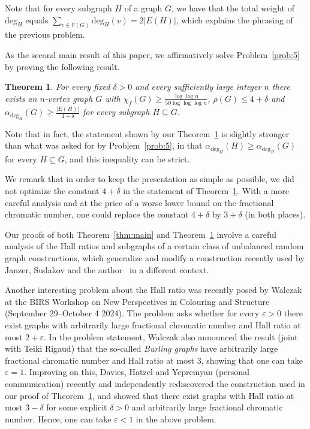 \documentclass[a4paper,10pt]{amsart}
\newtheorem{theorem}{Theorem}[section]
\begin{document}
Note that for every subgraph $H$ of a graph $G$, we have that the total weight of $\mathrm{deg}_H$ equals $\sum_{v\in V(G)}\mathrm{deg}_H(v)=2|E(H)|$, which explains the phrasing of the previous problem.

As the second main result of this paper, we affirmatively solve Problem~\ref{prob:5} by proving the following result. 

\begin{theorem}\label{thm:main2}
For every fixed $\delta >0$ and every sufficiently large integer $n$ there exists an $n$-vertex graph $G$ with $\chi_f(G)\ge \frac{\log \log n}{50 \log\log\log n}$, $\rho(G)\le 4+\delta$ and $\alpha_{\mathrm{deg}_H}(G)\ge \frac{|E(H)|}{4+\delta}$ for every subgraph $H\subseteq G$. 
\end{theorem}

Note that in fact, the statement shown by our Theorem~\ref{thm:main2} is slightly stronger than what was asked for by Problem~\ref{prob:5}, in that $\alpha_{\mathrm{deg}_H}(H)\ge \alpha_{\mathrm{deg}_H}(G)$ for every $H\subseteq G$, and this inequality can be strict.

We remark that in order to keep the presentation as simple as possible, we did not optimize the constant $4+\delta$ in the statement of Theorem~\ref{thm:main2}. With a more careful analysis and at the price of a worse lower bound on the fractional chromatic number, one could replace the constant $4+\delta$ by $3+\delta$ (in both places).

Our proofs of both Theorem~\ref{thm:main} and Theorem~\ref{thm:main2} involve a careful analysis of the Hall ratios and subgraphs of a certain class of unbalanced random graph constructions, which generalize and modify a construction recently used by Janzer, Sudakov and the author~\cite{janzer} in a different context.

Another interesting problem about the Hall ratio was recently posed by Walczak at the BIRS Workshop on New Perspectives in Colouring and Structure (September 29--October 4 2024). The problem asks whether for every $\varepsilon>0$ there exist graphs with arbitrarily large fractional chromatic number and Hall ratio at most $2+\varepsilon$. In the problem statement, Walczak also announced the result (joint with Teiki Rigaud) that the so-called \emph{Burling graphs} have arbitrarily large fractional chromatic number and Hall ratio at most $3$, showing that one can take $\varepsilon=1$.  Improving on this, Davies, Hatzel and Yepremyan (personal communication) recently and independently rediscovered the construction used in our proof of Theorem~\ref{thm:main2}, and showed that there exist graphs with Hall ratio at most $3-\delta$ for some explicit $\delta>0$ and arbitrarily large fractional chromatic number. Hence, one can take $\varepsilon<1$ in the above problem.
\end{document}
